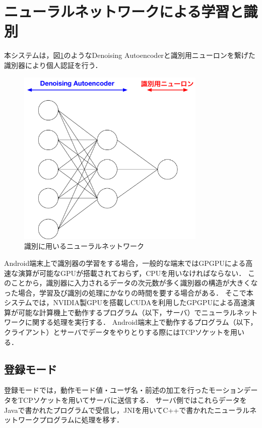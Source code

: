 \section{ニューラルネットワークによる学習と識別}
本システムは，図\ref{system-nn}のようなDenoising Autoencoderと識別用ニューロンを繋げた識別器により個人認証を行う．

\begin{figure}[hbtp]
  \centering
  \includegraphics[bb=0 0 622 587, width=9cm]{Figures/system-nn.pdf}
  \caption{識別に用いるニューラルネットワーク}
  \label{system-nn}
\end{figure}

Android端末上で識別器の学習をする場合，一般的な端末ではGPGPUによる高速な演算が可能なGPUが搭載されておらず，CPUを用いなければならない．
このことから，識別器に入力されるデータの次元数が多く識別器の構造が大きくなった場合，学習及び識別の処理にかなりの時間を要する場合がある．
そこで本システムでは，NVIDIA製GPUを搭載しCUDA\cite{4-cuda}を利用したGPGPUによる高速演算が可能な計算機上で動作するプログラム（以下，サーバ）でニューラルネットワークに関する処理を実行する．
Android端末上で動作するプログラム（以下，クライアント）とサーバでデータをやりとりする際にはTCPソケットを用いる．

\subsection{登録モード}
登録モードでは，動作モード値・ユーザ名・前述の加工を行ったモーションデータをTCPソケットを用いてサーバに送信する．
サーバ側ではこれらデータをJavaで書かれたプログラムで受信し，JNI\cite{4-jni}を用いてC++で書かれたニューラルネットワークプログラムに処理を移す．

